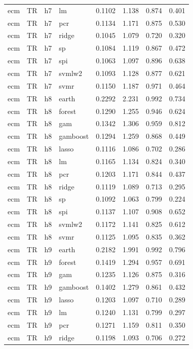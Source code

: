\begin{ThreePartTable}
\begin{longtable}[t]{llclcccc}
ecm & TR & h7 & lm & 0.1102 & 1.138 & 0.874 & 0.401\\
ecm & TR & h7 & pcr & 0.1134 & 1.171 & 0.875 & 0.530\\
ecm & TR & h7 & ridge & 0.1045 & 1.079 & 0.720 & 0.320\\
ecm & TR & h7 & sp & 0.1084 & 1.119 & 0.867 & 0.472\\
ecm & TR & h7 & spi & 0.1063 & 1.097 & 0.896 & 0.638\\
ecm & TR & h7 & svmlw2 & 0.1093 & 1.128 & 0.877 & 0.621\\
ecm & TR & h7 & svmr & 0.1150 & 1.187 & 0.971 & 0.464\\
\addlinespace
ecm & TR & h8 & earth & 0.2292 & 2.231 & 0.992 & 0.734\\
ecm & TR & h8 & forest & 0.1290 & 1.255 & 0.946 & 0.624\\
ecm & TR & h8 & gam & 0.1342 & 1.306 & 0.959 & 0.812\\
ecm & TR & h8 & gamboost & 0.1294 & 1.259 & 0.868 & 0.449\\
ecm & TR & h8 & lasso & 0.1116 & 1.086 & 0.702 & 0.286\\
ecm & TR & h8 & lm & 0.1165 & 1.134 & 0.824 & 0.340\\
ecm & TR & h8 & pcr & 0.1203 & 1.171 & 0.844 & 0.437\\
ecm & TR & h8 & ridge & 0.1119 & 1.089 & 0.713 & 0.295\\
ecm & TR & h8 & sp & 0.1092 & 1.063 & 0.799 & 0.224\\
ecm & TR & h8 & spi & 0.1137 & 1.107 & 0.908 & 0.652\\
ecm & TR & h8 & svmlw2 & 0.1172 & 1.141 & 0.825 & 0.612\\
ecm & TR & h8 & svmr & 0.1125 & 1.095 & 0.835 & 0.362\\
\addlinespace
ecm & TR & h9 & earth & 0.2182 & 1.991 & 0.992 & 0.796\\
ecm & TR & h9 & forest & 0.1419 & 1.294 & 0.957 & 0.691\\
ecm & TR & h9 & gam & 0.1235 & 1.126 & 0.875 & 0.316\\
ecm & TR & h9 & gamboost & 0.1402 & 1.279 & 0.861 & 0.432\\
ecm & TR & h9 & lasso & 0.1203 & 1.097 & 0.710 & 0.289\\
ecm & TR & h9 & lm & 0.1240 & 1.131 & 0.799 & 0.297\\
ecm & TR & h9 & pcr & 0.1271 & 1.159 & 0.811 & 0.350\\
ecm & TR & h9 & ridge & 0.1198 & 1.093 & 0.706 & 0.272\\

\end{longtable}
\end{ThreePartTable}
